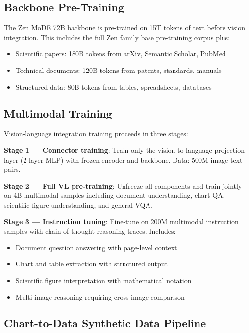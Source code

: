 \documentclass[11pt,a4paper]{article}
\begin{document}
\subsection{Backbone Pre-Training}

The Zen MoDE 72B backbone is pre-trained on 15T tokens of text before vision
integration. This includes the full Zen family base pre-training corpus plus:

\begin{itemize}
\item Scientific papers: 180B tokens from arXiv, Semantic Scholar, PubMed
\item Technical documents: 120B tokens from patents, standards, manuals
\item Structured data: 80B tokens from tables, spreadsheets, databases
\end{itemize}

\subsection{Multimodal Training}

Vision-language integration training proceeds in three stages:

\textbf{Stage 1 --- Connector training}: Train only the vision-to-language projection
layer (2-layer MLP) with frozen encoder and backbone. Data: 500M image-text pairs.

\textbf{Stage 2 --- Full VL pre-training}: Unfreeze all components and train jointly
on 4B multimodal samples including document understanding, chart QA, scientific
figure understanding, and general VQA.

\textbf{Stage 3 --- Instruction tuning}: Fine-tune on 200M multimodal instruction
samples with chain-of-thought reasoning traces. Includes:
\begin{itemize}
\item Document question answering with page-level context
\item Chart and table extraction with structured output
\item Scientific figure interpretation with mathematical notation
\item Multi-image reasoning requiring cross-image comparison
\end{itemize}

\subsection{Chart-to-Data Synthetic Data Pipeline}
\end{document}
